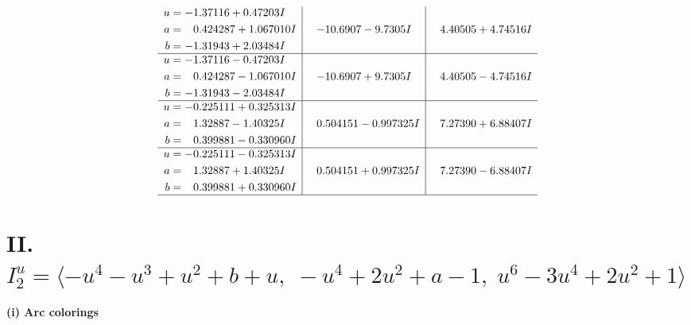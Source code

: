 \documentclass[1p]{elsarticle_modified}
\theoremstyle{definition}
\begin{document}
$$\begin{array}{c|c|c}
\begin{aligned}
u &= -1.37116 + 0.47203 I \\
a &= \phantom{-}0.424287 + 1.067010 I \\
b &= -1.31943 + 2.03484 I\end{aligned}
 & -10.6907 - 9.7305 I & \phantom{-}4.40505 + 4.74516 I \\ \hline\begin{aligned}
u &= -1.37116 - 0.47203 I \\
a &= \phantom{-}0.424287 - 1.067010 I \\
b &= -1.31943 - 2.03484 I\end{aligned}
 & -10.6907 + 9.7305 I & \phantom{-}4.40505 - 4.74516 I \\ \hline\begin{aligned}
u &= -0.225111 + 0.325313 I \\
a &= \phantom{-}1.32887 - 1.40325 I \\
b &= \phantom{-}0.399881 - 0.330960 I\end{aligned}
 & \phantom{-}0.504151 - 0.997325 I & \phantom{-}7.27390 + 6.88407 I \\ \hline\begin{aligned}
u &= -0.225111 - 0.325313 I \\
a &= \phantom{-}1.32887 + 1.40325 I \\
b &= \phantom{-}0.399881 + 0.330960 I\end{aligned}
 & \phantom{-}0.504151 + 0.997325 I & \phantom{-}7.27390 - 6.88407 I\\
 \hline 
 \end{array}$$\newpage\newpage\renewcommand{\arraystretch}{1}
\centering \section*{II. $I^u_{2}= \langle - u^4- u^3+u^2+b+u,\;- u^4+2 u^2+a-1,\;u^6-3 u^4+2 u^2+1 \rangle$}
\flushleft \textbf{(i) Arc colorings}\\
\end{document}
